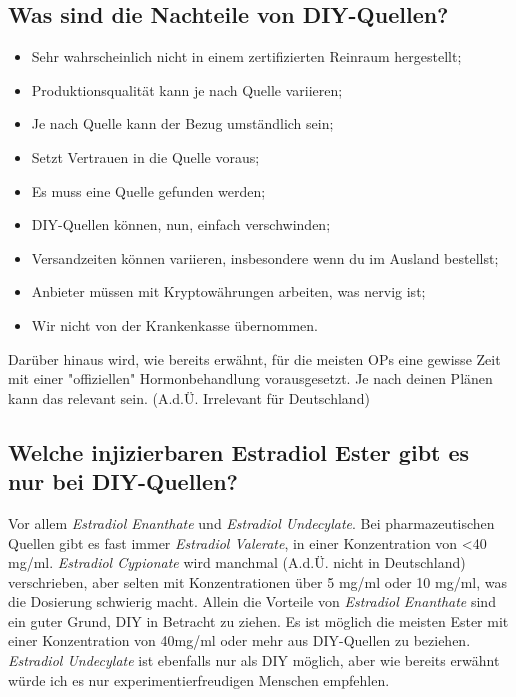 \documentclass{article}
\begin{document}
\subsection{Was sind die Nachteile von DIY-Quellen?}

\begin{itemize}
  \item Sehr wahrscheinlich nicht in einem zertifizierten Reinraum hergestellt;
  \item Produktionsqualität kann je nach Quelle variieren;
  \item Je nach Quelle kann der Bezug umständlich sein;
  \item Setzt Vertrauen in die Quelle voraus;
  \item Es muss eine Quelle gefunden werden;
  \item DIY-Quellen können, nun, einfach verschwinden;
  \item Versandzeiten können variieren, insbesondere wenn du im Ausland bestellst;
  \item Anbieter müssen mit Kryptowährungen arbeiten, was nervig ist;
  \item Wir nicht von der Krankenkasse übernommen.
\end{itemize}

Darüber hinaus wird, wie bereits erwähnt, für die meisten OPs eine gewisse Zeit mit einer "offiziellen" Hormonbehandlung vorausgesetzt. Je nach deinen Plänen kann das relevant sein. (A.d.Ü. Irrelevant für Deutschland)

\subsection{Welche injizierbaren Estradiol Ester gibt es nur bei DIY-Quellen?}

Vor allem \textit{Estradiol Enanthate} und \textit{Estradiol Undecylate}. Bei pharmazeutischen Quellen gibt es fast immer \textit{Estradiol Valerate}, in einer Konzentration von <40 mg/ml. \textit{Estradiol Cypionate} wird manchmal (A.d.Ü. nicht in Deutschland) verschrieben, aber selten mit Konzentrationen über 5 mg/ml oder 10 mg/ml, was die Dosierung schwierig macht. Allein die Vorteile von \textit{Estradiol Enanthate} sind ein guter Grund, DIY in Betracht zu ziehen. Es ist möglich die meisten Ester mit einer Konzentration von 40mg/ml oder mehr aus DIY-Quellen zu beziehen. \textit{Estradiol Undecylate} ist ebenfalls nur als DIY möglich, aber wie bereits erwähnt würde ich es nur experimentierfreudigen Menschen empfehlen.
\end{document}
